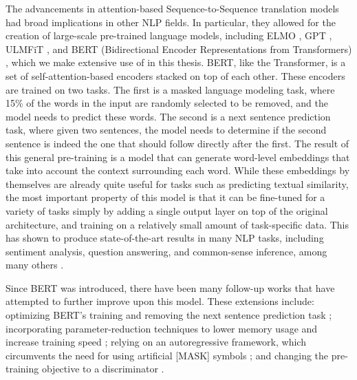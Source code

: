 \documentclass[thesis.tex]{subfiles}
\begin{document}
The advancements in attention-based Sequence-to-Sequence translation models had broad implications in other NLP fields. In particular, they allowed for the creation of large-scale pre-trained language models, including ELMO \citep{peters2018deep}, GPT \citep{radford2018improving}, ULMFiT \citep{howard2018universal}, and BERT (Bidirectional Encoder Representations from Transformers) \citep{devlin2019bert}, which we make extensive use of in this thesis. BERT, like the Transformer, is a set of self-attention-based encoders stacked on top of each other. These encoders are trained on two tasks. The first is a masked language modeling task, where 15\% of the words in the input are randomly selected to be removed, and the model needs to predict these words. The second is a next sentence prediction task, where given two sentences, the model needs to determine if the second sentence is indeed the one that should follow directly after the first. The result of this general pre-training is a model that can generate word-level embeddings that take into account the context surrounding each word. While these embeddings by themselves are already quite useful for tasks such as predicting textual similarity, the most important property of this model is that it can be fine-tuned for a variety of tasks simply by adding a single output layer on top of the original architecture, and training on a relatively small amount of task-specific data. This has shown to produce state-of-the-art results in many NLP tasks, including sentiment analysis, question answering, and common-sense inference, among many others \citep{devlin2019bert}. 

Since BERT was introduced, there have been many follow-up works that have attempted to further improve upon this model. These extensions include: optimizing BERT's training and removing the next sentence prediction task \citep{liu2019roberta}; incorporating parameter-reduction techniques to lower memory usage and increase training speed \citep{sanh2019distilbert,lan2020albert}; relying on an autoregressive framework, which circumvents the need for using artificial [MASK] symbols \citep{yang2019xlnet}; and changing the pre-training objective to a discriminator \citep{clark2020electra}.
\end{document}
